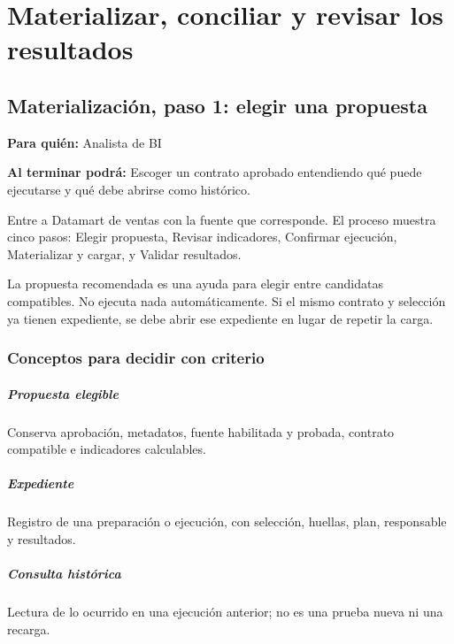 \chapter{Materializar, conciliar y revisar los resultados}
\begingroup
\setlength{\parskip}{4pt plus 1pt minus 1pt}
\titlespacing*{\paragraph}{0pt}{4pt}{0.5em}
\section{Materialización, paso 1: elegir una propuesta}
\label{unidad:ETL01}
\textbf{Para quién:} Analista de BI\par
\textbf{Al terminar podrá:} Escoger un contrato aprobado entendiendo qué puede ejecutarse y qué debe abrirse como histórico.

Entre a Datamart de ventas con la fuente que corresponde. El proceso muestra cinco pasos: Elegir propuesta, Revisar indicadores, Confirmar ejecución, Materializar y cargar, y Validar resultados.

La propuesta recomendada es una ayuda para elegir entre candidatas compatibles. No ejecuta nada automáticamente. Si el mismo contrato y selección ya tienen expediente, se debe abrir ese expediente en lugar de repetir la carga.

\subsection{Conceptos para decidir con criterio}
\paragraph{Propuesta elegible} Conserva aprobación, metadatos, fuente habilitada y probada, contrato compatible e indicadores calculables.

\paragraph{Expediente} Registro de una preparación o ejecución, con selección, huellas, plan, responsable y resultados.

\paragraph{Consulta histórica} Lectura de lo ocurrido en una ejecución anterior; no es una prueba nueva ni una recarga.

